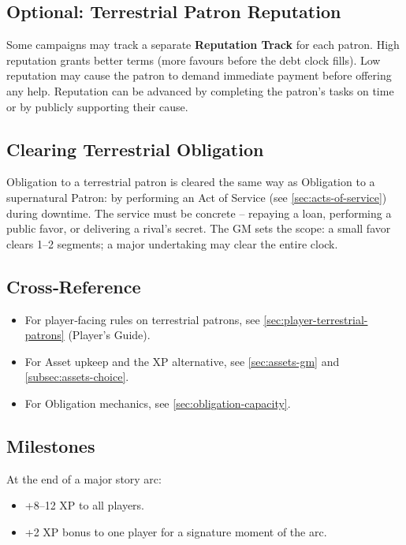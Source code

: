 \subsection{Optional: Terrestrial Patron Reputation}
Some campaigns may track a separate \textbf{Reputation Track} for each patron. High reputation grants better terms (more favours before the debt clock fills). Low reputation may cause the patron to demand immediate payment before offering any help. Reputation can be advanced by completing the patron’s tasks on time or by publicly supporting their cause.

\subsection{Clearing Terrestrial Obligation}
Obligation to a terrestrial patron is cleared the same way as Obligation to a supernatural Patron: by performing an Act of Service (see \ref{sec:acts-of-service}) during downtime. The service must be concrete – repaying a loan, performing a public favor, or delivering a rival’s secret. The GM sets the scope: a small favor clears 1–2 segments; a major undertaking may clear the entire clock.

\subsection{Cross‑Reference}
\begin{itemize}
  \item For player‑facing rules on terrestrial patrons, see \ref{sec:player-terrestrial-patrons} (Player’s Guide).
  \item For Asset upkeep and the XP alternative, see \ref{sec:assets-gm} and \ref{subsec:assets-choice}.
  \item For Obligation mechanics, see \ref{sec:obligation-capacity}.
\end{itemize}

\label{sec:terrestrial-patrons-gm}

\subsection{Milestones}
\label{subsec:xp-milestones}

At the end of a major story arc:
\begin{itemize}
  \item +8–12 XP to all players.
  \item +2 XP bonus to one player for a signature moment of the arc.
\end{itemize}

